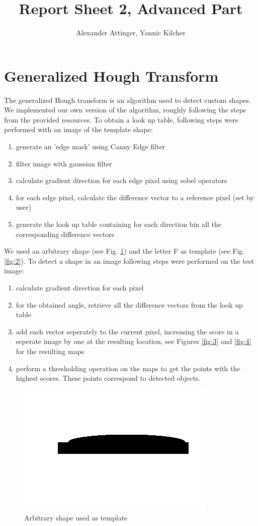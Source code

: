 \documentclass[11pt,a4paper]{article}
\author{Alexander Attinger, Yannic Kilcher}
\title{Report Sheet 2, Advanced Part}
\begin{document}
\maketitle


\section{Generalized Hough Transform}

The generalized Hough transform is an algorithm used to detect custom shapes. We implemented our own version of the algorithm, roughly following the steps	from the provided resources. To obtain a look up table, following steps were performed with an image of the template shape:
\begin{enumerate}
\item generate an 'edge mask' using Canny Edge filter
\item filter image with gaussian filter
\item calculate gradient direction for each edge pixel using sobel operators
\item for each edge pixel, calculate the difference vector to a reference pixel (set by user)
\item generate the look up table containing for each direction bin all the corresponding difference vectors
\end{enumerate}

We used an arbitrary shape (see Fig. \ref{fig:1}) and the letter F as template (see Fig. \ref{fig:2}). To detect a shape in an image following steps were performed on the test image:

\begin{enumerate}
\item calculate gradient direction for each pixel
\item for the obtained angle, retrieve all the difference vectors from the look up table
\item add each vector seperately to the current pixel, increasing the score in a seperate image by one at the resulting location, see Figures \ref{fig:3} and \ref{fig:4} for the resulting maps
\item perform a thresholding operation on the maps to get the points with the highest scores. These points correspond to detected objects.
\end{enumerate}

\begin{figure}
\centering
\includegraphics[scale=.4]{img/templateShape.png}

\caption{Arbitrary shape used as template}
\label{fig:1}
\end{figure}
\end{document}
